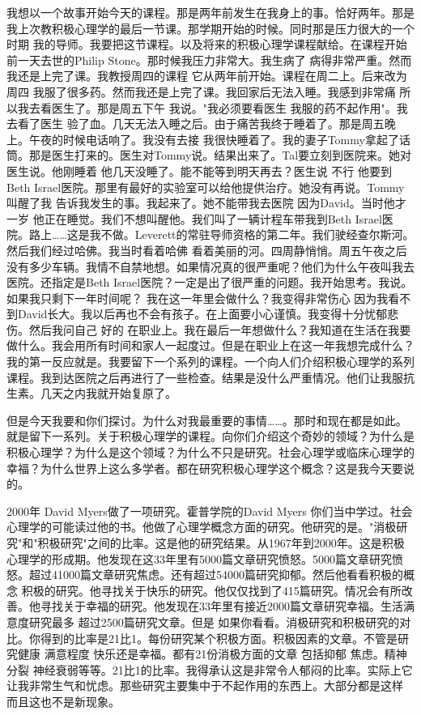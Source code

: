 我想以一个故事开始今天的课程。那是两年前发生在我身上的事。恰好两年。那是我上次教积极心理学的最后一节课。那学期开始的时候。同时那是压力很大的一个时期 我的导师。我要把这节课程。以及将来的积极心理学课程献给。在课程开始前一天去世的Philip Stone。那时候我压力非常大。我生病了 病得非常严重。然而我还是上完了课。我教授周四的课程 它从两年前开始。课程在周二上。后来改为周四 我服了很多药。然而我还是上完了课。我回家后无法入睡。我感到非常痛 所以我去看医生了。那是周五下午 我说。"我必须要看医生 我服的药不起作用"。我去看了医生 验了血。几天无法入睡之后。由于痛苦我终于睡着了。那是周五晚上。午夜的时候电话响了。我没有去接 我很快睡着了。我的妻子Tommy拿起了话筒。那是医生打来的。医生对Tommy说。结果出来了。Tal要立刻到医院来。她对医生说。他刚睡着 他几天没睡了。能不能等到明天再去？医生说 不行 他要到Beth Israel医院。那里有最好的实验室可以给他提供治疗。她没有再说。Tommy叫醒了我 告诉我发生的事。我起来了。她不能带我去医院 因为David。当时他才一岁 他正在睡觉。我们不想叫醒他。我们叫了一辆计程车带我到Beth Israel医院。路上……这是我不做。Leverett的常驻导师资格的第二年。我们驶经查尔斯河。然后我们经过哈佛。我当时看着哈佛 看着美丽的河。四周静悄悄。周五午夜之后没有多少车辆。我情不自禁地想。如果情况真的很严重呢？他们为什么午夜叫我去医院。还指定是Beth Israel医院？一定是出了很严重的问题。我开始思考。我说。如果我只剩下一年时间呢？ 我在这一年里会做什么？我变得非常伤心 因为我看不到David长大。我以后再也不会有孩子。在上面要小心谨慎。我变得十分忧郁悲伤。然后我问自己 好的 在职业上。我在最后一年想做什么？我知道在生活在我要做什么。我会用所有时间和家人一起度过。但是在职业上在这一年我想完成什么？我的第一反应就是。我要留下一个系列的课程。一个向人们介绍积极心理学的系列课程。我到达医院之后再进行了一些检查。结果是没什么严重情况。他们让我服抗生素。几天之内我就开始复原了。 

但是今天我要和你们探讨。为什么对我最重要的事情……。那时和现在都是如此。就是留下一系列。关于积极心理学的课程。向你们介绍这个奇妙的领域？为什么是积极心理学？为什么是这个领域？为什么不只是研究。社会心理学或临床心理学的幸福？为什么世界上这么多学者。都在研究积极心理学这个概念？这是我今天要说的。 

2000年 David Myers做了一项研究。霍普学院的David Myers 你们当中学过。社会心理学的可能读过他的书。他做了心理学概念方面的研究。他研究的是。"消极研究"和"积极研究"之间的比率。这是他的研究结果。从1967年到2000年。这是积极心理学的形成期。他发现在这33年里有5000篇文章研究愤怒。5000篇文章研究愤怒。超过41000篇文章研究焦虑。还有超过54000篇研究抑郁。然后他看看积极的概念 积极的研究。他寻找关于快乐的研究。他仅仅找到了415篇研究。情况会有所改善。他寻找关于幸福的研究。他发现在33年里有接近2000篇文章研究幸福。生活满意度研究最多 超过2500篇研究文章。但是 如果你看看。消极研究和积极研究的对比。你得到的比率是21比1。每份研究某个积极方面。积极因素的文章。不管是研究健康 满意程度 快乐还是幸福。都有21份消极方面的文章 包括抑郁 焦虑。精神分裂 神经衰弱等等。21比1的比率。我得承认这是非常令人郁闷的比率。实际上它让我非常生气和忧虑。那些研究主要集中于不起作用的东西上。大部分都是这样 而且这也不是新现象。 

